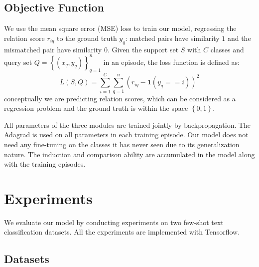 \documentclass[11pt,a4paper]{article}
\begin{document}
\subsection{Objective Function}
We use the mean square error (MSE) loss to train our model, regressing the relation score $r_{iq}$ to the ground truth $y_q$: matched pairs have similarity $1$ and the mismatched pair have similarity $0$. Given the support set $S$ with $C$ classes and query set $Q=\left\{ {\left( {{x_q},{y_q}} \right)} \right\}_{q = 1}^n$ in an episode, the loss function is defined as:
\begin{equation}
L\left( {S, Q} \right) = \sum\limits_{i=1}^C {\sum\limits_{q=1}^n {{{({r_{iq}} - \textbf{1}({y_q}==i))}^2}} } \label{Loss}
\end{equation}
conceptually we are predicting relation scores, which can be considered as a regression problem and the ground truth is within the space $\left\{ {\left. {0,1} \right\}} \right.$.

All parameters of the three modules are trained jointly by backpropagation. The Adagrad \cite{duchi2011adaptive} is used on all parameters in each training episode. 
Our model does not need any fine-tuning on the classes it has never seen due to its generalization nature. The induction and comparison ability are accumulated in the model along with the training episodes.

\section{Experiments}
We evaluate our model by conducting experiments on two few-shot text classification datasets. All the experiments are implemented with Tensorflow.
\subsection{Datasets}
\end{document}
